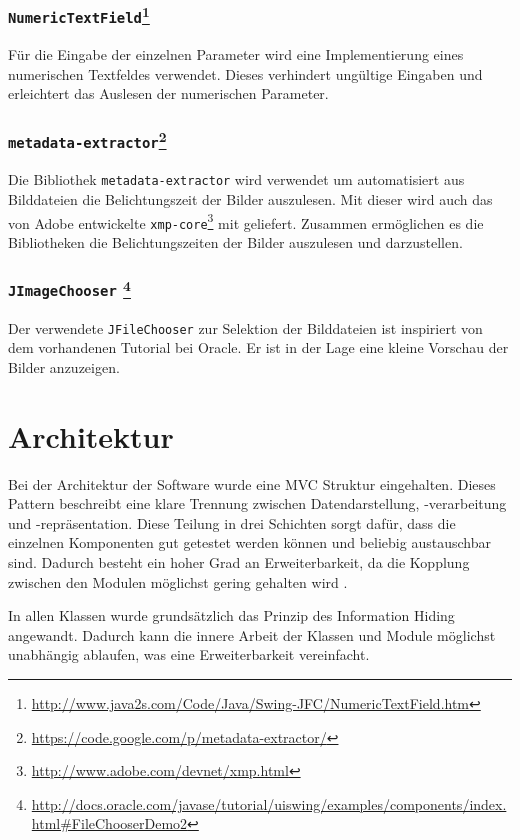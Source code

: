 \subsubsection*{\texttt{NumericTextField}\footnote{\url{http://www.java2s.com/Code/Java/Swing-JFC/NumericTextField.htm}}}
Für die Eingabe der einzelnen Parameter wird eine Implementierung eines numerischen Textfeldes verwendet. Dieses verhindert ungültige Eingaben und erleichtert das Auslesen der numerischen Parameter.

\subsubsection*{\texttt{metadata-extractor}\footnote{\url{https://code.google.com/p/metadata-extractor/}}}
Die Bibliothek \texttt{metadata-extractor} wird verwendet um automatisiert aus Bilddateien die Belichtungszeit der Bilder auszulesen. Mit dieser wird auch das von Adobe entwickelte \texttt{xmp-core}\footnote{\url{http://www.adobe.com/devnet/xmp.html}} mit geliefert. Zusammen ermöglichen es die Bibliotheken die Belichtungszeiten der Bilder auszulesen und darzustellen.

\subsubsection*{\texttt{JImageChooser} \footnote{\url{http://docs.oracle.com/javase/tutorial/uiswing/examples/components/index.html\#FileChooserDemo2}}} 
Der verwendete \texttt{JFileChooser} zur Selektion der Bilddateien ist inspiriert von dem vorhandenen Tutorial bei Oracle. Er ist in der Lage eine kleine Vorschau der Bilder anzuzeigen.


\section{Architektur}
\label{sec:architektur}
Bei der Architektur der Software wurde eine \gls{MVC} Struktur eingehalten. Dieses Pattern beschreibt eine klare Trennung zwischen Datendarstellung, -verarbeitung und -repräsentation. Diese Teilung in drei Schichten sorgt dafür, dass die einzelnen Komponenten gut getestet werden können und beliebig austauschbar sind. Dadurch besteht ein hoher Grad an Erweiterbarkeit, da die Kopplung zwischen den Modulen möglichst gering gehalten wird \cite[S.~413]{ludewig}.

In allen Klassen wurde grundsätzlich das Prinzip des Information Hiding angewandt. Dadurch kann die innere Arbeit der Klassen und Module möglichst unabhängig ablaufen, was eine Erweiterbarkeit vereinfacht.



